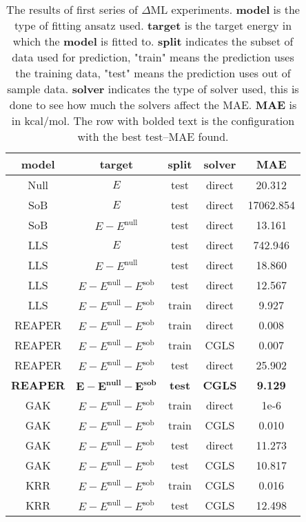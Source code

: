 \documentclass[12pt]{article}
\begin{document}
\begin{table}[H]
    \centering
    \caption{The results of first series of $\Delta$ML experiments. \textbf{model} is the type of fitting ansatz used. \textbf{target} is the target energy in which the \textbf{model} is fitted to. \textbf{split} indicates the subset of data used for prediction, "train" means the prediction uses the training data, "test" means the prediction uses out of sample data. \textbf{solver} indicates the type of solver used, this is done to see how much the solvers affect the MAE. \textbf{MAE} is in kcal/mol. The row with bolded text is the configuration with the best test--MAE found.}
    \begin{tabular}{|c|c|c|c|c|}
        \hline
        \textbf{model}	& \textbf{target}	& \textbf{split}	& \textbf{solver}	& \textbf{MAE}	\\ \hline
        Null	& $E$	& test	& direct	& 20.312	\\ \hline
        SoB	& $E$	& test	& direct	& 17062.854	\\ \hline
        SoB	& $E-E^\text{null}$	& test	& direct	& 13.161	\\ \hline
        LLS	& $E$	& test	& direct	& 742.946	\\ \hline
        LLS	& $E-E^\text{null}$	& test	& direct	& 18.860	\\ \hline
        LLS	& $E-E^\text{null}-E^\text{sob}$	& test	& direct	& 12.567	\\ \hline
        LLS	& $E-E^\text{null}-E^\text{sob}$	& train	& direct	& 9.927	\\ \hline
        REAPER	& $E-E^\text{null}-E^\text{sob}$	& train	& direct	& 0.008	\\ \hline
        REAPER	& $E-E^\text{null}-E^\text{sob}$	& train	& CGLS	& 0.007	\\ \hline
        REAPER	& $E-E^\text{null}-E^\text{sob}$	& test	& direct	& 25.902	\\ \hline
        \textbf{REAPER}	& $\mathbf{E-E^\text{null}-E^\text{sob}}$	& \textbf{test}	& \textbf{CGLS}	& \textbf{9.129}	\\ \hline
        GAK	& $E-E^\text{null}-E^\text{sob}$	& train	& direct	& 1e-6	\\ \hline
        GAK	& $E-E^\text{null}-E^\text{sob}$	& train	& CGLS	& 0.010	\\ \hline
        GAK	& $E-E^\text{null}-E^\text{sob}$	& test	& direct	& 11.273	\\ \hline
        GAK	& $E-E^\text{null}-E^\text{sob}$	& test	& CGLS	& 10.817	\\ \hline
        KRR	& $E-E^\text{null}-E^\text{sob}$	& train	& CGLS	& 0.016	\\ \hline
        KRR	& $E-E^\text{null}-E^\text{sob}$	& test	& CGLS	& 12.498	\\ \hline
        \end{tabular}
    \label{tb:delta1}
\end{table}
\end{document}
